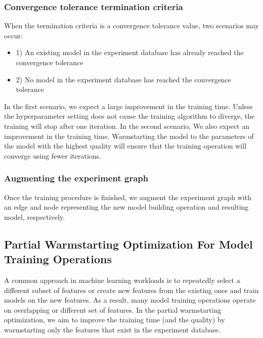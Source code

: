 \subsubsection{Convergence tolerance termination criteria}
When the termination criteria is a convergence tolerance value, two scenarios may occur:
\begin{itemize}
\item 1) An existing model in the experiment database has already reached the convergence tolerance
\item 2) No model in the experiment database has reached the convergence tolerance
\end{itemize}
In the first scenario, we expect a large improvement in the training time. 
Unless the hyperparameter setting does not cause the training algorithm to diverge, the training will stop after one iteration.
In the second scenario, We also expect an improvement in the training time.
Warmstarting the model to the parameters of the model with the highest quality will ensure that the training operation will converge using fewer iterations.

\subsubsection{Augmenting the experiment graph}
Once the training procedure is finished, we augment the experiment graph with an edge and node representing the new model building operation and resulting model, respectively.

\subsection{Partial Warmstarting Optimization For Model Training Operations}
A common approach in machine learning workloads is to repeatedly select a different subset of features or create new features from the existing ones and train models on the new features.
As a result, many model training operations operate on overlapping or different set of features.
In the partial warmstarting optimization, we aim to improve the training time (and the quality) by warmstarting only the features that exist in the experiment database.

